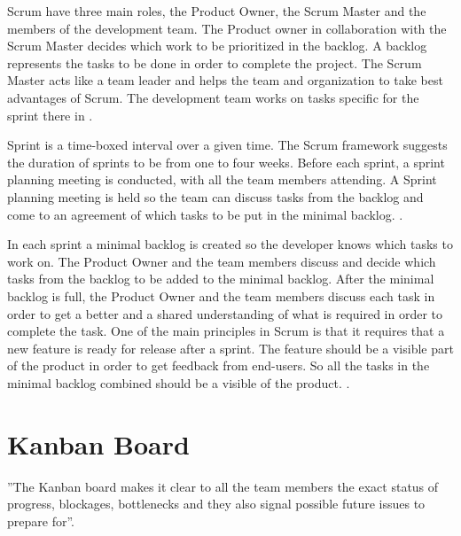 \documentclass[UKenglish]{ifimaster}  %
\begin{document}
Scrum have three main roles, the Product Owner, the Scrum Master and the members of the development team. The Product owner in collaboration with the Scrum Master decides which work to be prioritized in the backlog. A backlog represents the tasks to be done in order to complete the project. The Scrum Master acts like a team leader and helps the team and organization to take best advantages of Scrum. The development team works on tasks specific for the sprint there in \parencite{Scrum}.

Sprint is a time-boxed interval over a given time. The Scrum framework suggests the duration of sprints to be from one to four weeks. Before each sprint, a sprint planning meeting is conducted, with all the team members attending.  A Sprint planning meeting is held so the team can discuss tasks from the backlog and come to an agreement of which tasks to be put in the minimal backlog.  \parencite{Scrum}.

In each sprint a minimal backlog is created so the developer knows which tasks to work on. The Product Owner and the team members discuss and decide which tasks from the backlog to be added to the minimal backlog. After the minimal backlog is full, the Product Owner and the team members discuss each task in order to get a better and a shared understanding of what is required in order to complete the task. One of the main principles in Scrum is that it requires that a new feature is ready for release after a sprint. The feature should be a visible part of the product in order to get feedback from end-users. So all the tasks in the minimal backlog combined should be a visible of the product.  \parencite{Scrum}.

\section {Kanban Board}
''The Kanban board makes it clear to all the team members the exact status of progress, blockages, bottlenecks and they also signal possible future issues to prepare for''\parencite{Joyce}.
\end{document}
